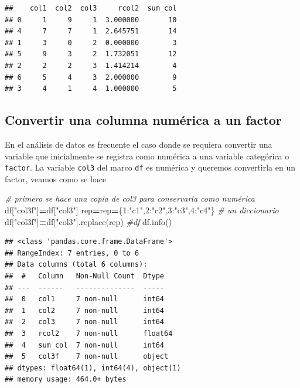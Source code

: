 \documentclass[
]{book}
\newenvironment{Shaded}{\begin{snugshade}}{\end{snugshade}}
\newcommand{\CommentTok}[1]{\textcolor[rgb]{0.56,0.35,0.01}{\textit{#1}}}
\newcommand{\DecValTok}[1]{\textcolor[rgb]{0.00,0.00,0.81}{#1}}
\newcommand{\NormalTok}[1]{#1}
\newcommand{\OperatorTok}[1]{\textcolor[rgb]{0.81,0.36,0.00}{\textbf{#1}}}
\newcommand{\StringTok}[1]{\textcolor[rgb]{0.31,0.60,0.02}{#1}}
\theoremstyle{definition}
\theoremstyle{definition}
\theoremstyle{definition}
\theoremstyle{definition}
\theoremstyle{remark}
\begin{document}
\begin{verbatim}
##    col1  col2  col3     rcol2  sum_col
## 0     1     9     1  3.000000       10
## 4     7     7     1  2.645751       14
## 1     3     0     2  0.000000        3
## 5     9     3     2  1.732051       12
## 2     2     2     3  1.414214        4
## 6     5     4     3  2.000000        9
## 3     4     1     4  1.000000        5
\end{verbatim}

\hypertarget{convertir-una-columna-numuxe9rica-a-un-factor}{%
\subsection{Convertir una columna numérica a un factor}\label{convertir-una-columna-numuxe9rica-a-un-factor}}

En el análisis de datos es frecuente el caso donde se requiera convertir una variable que inicialmente se registra como numérica a una variable categórica o \texttt{factor}. La variable \texttt{col3} del marco \texttt{df} es numérica y queremos convertirla en un factor, veamos como se hace

\begin{Shaded}
\begin{Highlighting}[]
\CommentTok{\# primero se hace una copia de col3 para conservarla como numérica}
\NormalTok{df[}\StringTok{"col3f"}\NormalTok{]}\OperatorTok{=}\NormalTok{df[}\StringTok{"col3"}\NormalTok{] }
\NormalTok{rep}\OperatorTok{=}\NormalTok{rep}\OperatorTok{=}\NormalTok{\{}\DecValTok{1}\NormalTok{:}\StringTok{"c1"}\NormalTok{,}\DecValTok{2}\NormalTok{:}\StringTok{"c2"}\NormalTok{,}\DecValTok{3}\NormalTok{:}\StringTok{"c3"}\NormalTok{,}\DecValTok{4}\NormalTok{:}\StringTok{"c4"}\NormalTok{\} }\CommentTok{\# un diccionario }
\NormalTok{df[}\StringTok{"col3f"}\NormalTok{]}\OperatorTok{=}\NormalTok{df[}\StringTok{"col3"}\NormalTok{].replace(rep)   }
\CommentTok{\#df}
\NormalTok{df.info()}
\end{Highlighting}
\end{Shaded}

\begin{verbatim}
## <class 'pandas.core.frame.DataFrame'>
## RangeIndex: 7 entries, 0 to 6
## Data columns (total 6 columns):
##  #   Column   Non-Null Count  Dtype  
## ---  ------   --------------  -----  
##  0   col1     7 non-null      int64  
##  1   col2     7 non-null      int64  
##  2   col3     7 non-null      int64  
##  3   rcol2    7 non-null      float64
##  4   sum_col  7 non-null      int64  
##  5   col3f    7 non-null      object 
## dtypes: float64(1), int64(4), object(1)
## memory usage: 464.0+ bytes
\end{verbatim}
\end{document}
